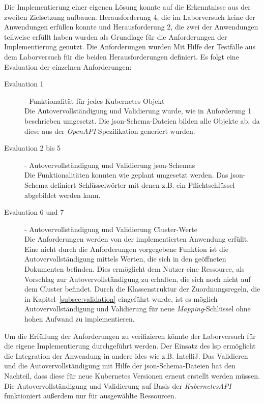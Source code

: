 Die Implementierung einer eigenen Lösung konnte auf die Erkenntnisse aus der zweiten Zielsetzung aufbauen.
Herausforderung 4, die im Laborversuch keine der Anwendungen erfüllen konnte und Herausforderung 2, die zwei der Anwendungen teilweise erfüllt haben
wurden als Grundlage für die Anforderungen der Implementierung genutzt.
Die Anforderungen wurden Mit Hilfe der Testfälle aus dem Laborversuch für die beiden Herausforderungen definiert.
Es folgt eine Evaluation der einzelnen Anforderungen:
\begin{description}
    \item[Evaluation 1]{- Funktionalität für jedes Kubernetes Objekt\\}
          Die Autovervollständigung und Validierung wurde, wie in Anforderung 1 beschrieben umgesetzt.
          Die \ac{json}-Schema-Dateien bilden alle Objekte ab, da diese aus der \textit{OpenAPI}-Spezifikation generiert wurden.
    \item[Evaluation 2 bis 5]{- Autovervollständigung und Validierung \ac{json}-Schemas\\}
          Die Funktionalitäten konnten wie geplant umgesetzt werden. Das \ac{json}-Schema
          definiert Schlüsselwörter mit denen z.B. ein Pflichtschlüssel abgebildet werden kann.
    \item[Evaluation 6 und 7]{- Autovervollständigung und Validierung Cluster-Werte\\}
          Die Anforderungen werden von der implementierten Anwendung erfüllt.
          Eine nicht durch die Anforderungen vorgegebene Funktion ist die Autovervollständigung
          mittels Werten, die sich in den geöffneten Dokumenten befinden. Dies ermöglicht dem Nutzer eine Ressource, als Vorschlag zur Autovervollständigung
          zu erhalten, die sich noch nicht auf dem Cluster befindet.
          Durch die Klassenstruktur der Zuordnungsregeln, die in Kapitel~\ref{subsec:validation} eingeführt wurde, ist
          es möglich Autovervollständigung und Validierung für neue \textit{Mapping}-Schlüssel ohne hohen Aufwand zu implementieren.

\end{description}
Um die Erfüllung der Anforderungen zu verifizieren könnte der Laborversuch für die eigene Implementierung durchgeführt werden.
Der Einsatz des \ac{lsp} ermöglicht die Integration der Anwendung in andere \ac{ide}s wie z.B. IntelliJ.
Das Validieren und die Autovervollständigung mit Hilfe der \ac{json}-Schema-Dateien hat den Nachteil, dass diese für neue Kubernetes Versionen
erneut erstellt werden müssen.
Die Autovervollständigung und Validierung auf Basis der \textit{KubernetesAPI} funktioniert außerdem nur für ausgewählte Ressourcen.

